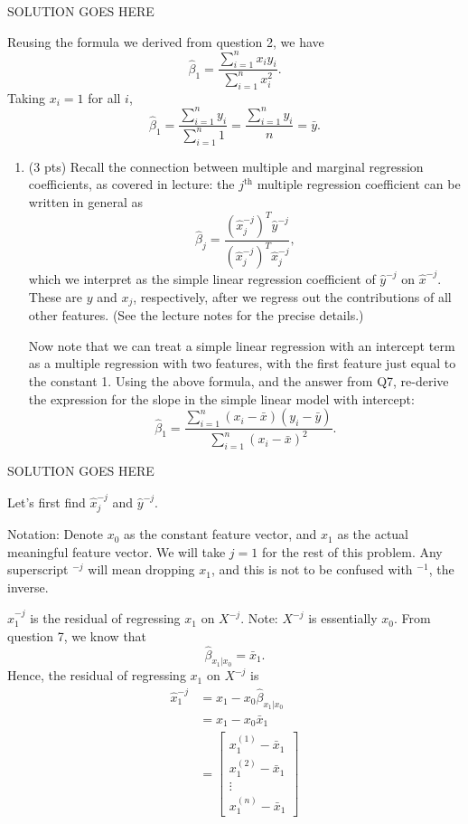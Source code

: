 \documentclass[
]{article}
\begin{document}
SOLUTION GOES HERE

Reusing the formula we derived from question 2, we have
\[\hat{\beta}_1 = \frac{\sum_{i=1}^{n}x_iy_i}{\sum_{i=1}^{n}x_i^2}.\]
Taking \(x_i = 1\) for all \(i\),
\[\hat{\beta}_1 = \frac{\sum_{i=1}^{n}y_i}{\sum_{i=1}^{n}1} = \frac{\sum_{i=1}^{n}y_i}{n} = \bar{y}.\]

\begin{enumerate}
\def\labelenumi{\arabic{enumi}.}
\setcounter{enumi}{7}
\item
  (3 pts) Recall the connection between multiple and marginal regression
  coefficients, as covered in lecture: the \(j^{\text{th}}\) multiple
  regression coefficient can be written in general as \[
  \hat\beta_j = \frac{(\hat{x}^{-j}_j)^T \hat{y}^{-j}}
  {(\hat{x}^{-j}_j)^T \hat{x}^{-j}_j},
  \] which we interpret as the simple linear regression coefficient of
  \(\hat{y}^{-j}\) on \(\hat{x}^{-j}\). These are \(y\) and \(x_j\),
  respectively, after we regress out the contributions of all other
  features. (See the lecture notes for the precise details.)

  Now note that we can treat a simple linear regression with an
  intercept term as a multiple regression with two features, with the
  first feature just equal to the constant 1. Using the above formula,
  and the answer from Q7, re-derive the expression for the slope in the
  simple linear model with intercept: \[
  \hat\beta_1 = \frac{\sum_{i=1}^n (x_i - \bar{x}) (y_i - \bar{y})} 
    {\sum_{i=1}^n (x_i - \bar{x})^2}.
  \]
\end{enumerate}

SOLUTION GOES HERE

Let's first find \(\hat{x}_j^{-j}\) and \(\hat{y}^{-j}\).

Notation: Denote \(x_0\) as the constant feature vector, and \(x_1\) as
the actual meaningful feature vector. We will take \(j = 1\) for the
rest of this problem. Any superscript \(^{-j}\) will mean dropping
\(x_1\), and this is not to be confused with \(^{-1}\), the inverse.

\(\hat{x}_1^{-j}\) is the residual of regressing \(x_1\) on \(X^{-j}\).
Note: \(X^{-j}\) is essentially \(x_0\). From question 7, we know that
\[\hat{\beta}_{x_1|x_0} = \bar{x}_1.\] Hence, the residual of regressing
\(x_1\) on \(X^{-j}\) is \begin{align*}
    \hat{x}_1^{-j} & = x_1 - x_0\hat{\beta}_{x_1|x_0} \\
    & = x_1 - x_0\bar{x}_1 \\
    & = \begin{bmatrix}
        x_1^{(1)} - \bar{x}_1 \\
        x_1^{(2)} - \bar{x}_1 \\
        \vdots \\
        x_1^{(n)} - \bar{x}_1 
    \end{bmatrix}
\end{align*}
\end{document}
